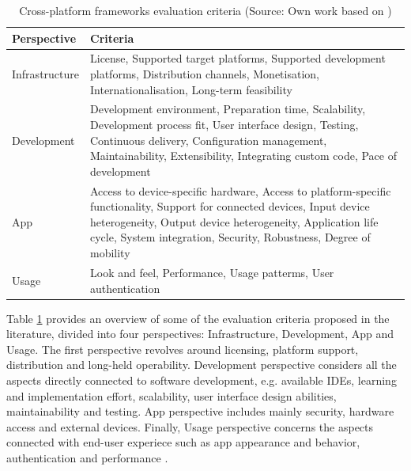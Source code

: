 \begin{table}[h]
	\centering
	\caption{Cross-platform frameworks evaluation criteria (Source: Own work based on \cite{rieger_eval_cp})}
	\label{tab:eval_criteria}
	\begin{tabular}{ |l|p{}| }
		\hline
		\textbf{Perspective} & \textbf{Criteria}                                                                                                                                                                                                                                           \\
		\hline
		Infrastructure       & License, Supported target platforms, Supported development platforms, Distribution channels, Monetisation, Internationalisation, Long-term feasibility                                                                                                      \\
		\hline
		Development          & Development environment, Preparation time, Scalability, Development process fit, User interface design, Testing, Continuous delivery, Configuration management, Maintainability, Extensibility, Integrating custom code, Pace of development                \\
		\hline
		App                  & Access to device-specific hardware, Access to platform-specific functionality, Support for connected devices, Input device heterogeneity, Output device heterogeneity, Application life cycle, System integration, Security, Robustness, Degree of mobility \\
		\hline
		Usage                & Look and feel, Performance, Usage patterms, User authentication                                                                                                                                                                                             \\
		\hline
	\end{tabular}
\end{table}

Table \ref{tab:eval_criteria} provides an overview of some of the evaluation criteria proposed in the literature, divided into four perspectives: Infrastructure, Development, App and Usage. The first perspective revolves around licensing, platform support, distribution and long-held operability. Development perspective considers all the aspects directly connected to software development, e.g. available IDEs, learning and implementation effort, scalability, user interface design abilities, maintainability and testing. App perspective includes mainly security, hardware access and external devices. Finally, Usage perspective concerns the aspects connected with end-user experiece such as app appearance and behavior, authentication and performance \cite{eval_rn_flutter,rieger_eval_cp}.

